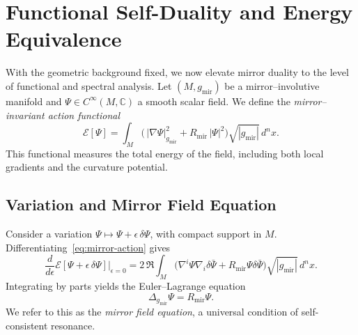 
\section{Functional Self-Duality and Energy Equivalence}\relax \hspace{0pt}

With the geometric background fixed, we now elevate mirror duality
to the level of functional and spectral analysis.
Let \((M,g_{\mathrm{mir}})\) be a mirror–involutive manifold
and \(\Psi\in C^{\infty}(M,\mathbb{C})\)
a smooth scalar field.
We define the \emph{mirror–invariant action functional}
\begin{equation}
\label{eq:mirror-action}
\mathcal{E}[\Psi]
=\int_{M}\Big(\,|\nabla\Psi|^{2}_{g_{\mathrm{mir}}}
+R_{\mathrm{mir}}\,|\Psi|^{2}\Big)\sqrt{|g_{\mathrm{mir}}|}\,d^{n}x.
\end{equation}
This functional measures the total energy of the field,
including both local gradients and the curvature potential.

\subsection{Variation and Mirror Field Equation}\relax \hspace{0pt}

Consider a variation \(\Psi\mapsto \Psi+\epsilon\,\delta\Psi\),
with compact support in \(M\).
Differentiating~\eqref{eq:mirror-action} gives
\[
\frac{d}{d\epsilon}\mathcal{E}[\Psi+\epsilon\,\delta\Psi]\Big|_{\epsilon=0}
=2\,\Re\!\int_{M}
\big(\nabla^{i}\Psi\nabla_{i}\delta\bar{\Psi}
+R_{\mathrm{mir}}\Psi\delta\bar{\Psi}\big)\sqrt{|g_{\mathrm{mir}}|}\,d^{n}x.
\]
Integrating by parts yields the Euler–Lagrange equation
\begin{equation}
\boxed{\;
\Delta_{g_{\mathrm{mir}}}\Psi
=R_{\mathrm{mir}}\Psi.
\;}
\end{equation}
We refer to this as the \textit{mirror field equation},
a universal condition of self-consistent resonance.

